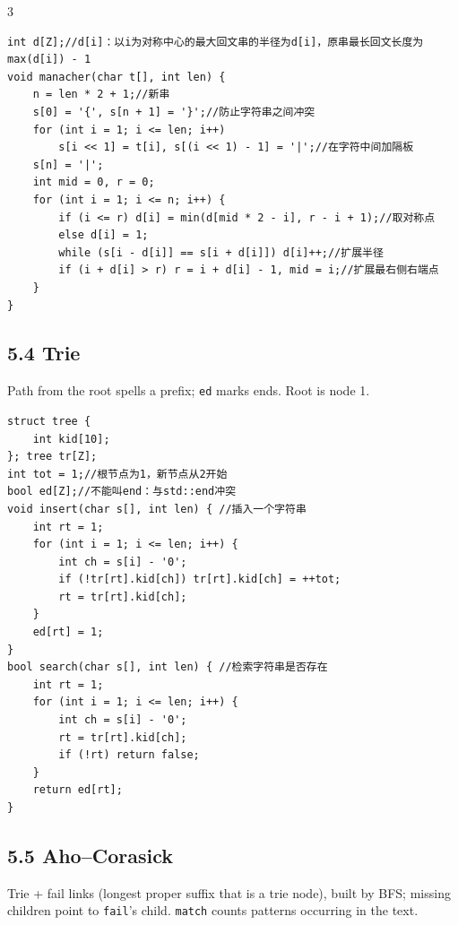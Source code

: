 \documentclass[8pt]{extarticle}
\begin{document}
\begin{multicols*}{3}
\begin{lstlisting}
int d[Z];//d[i]：以i为对称中心的最大回文串的半径为d[i]，原串最长回文长度为max(d[i]) - 1
void manacher(char t[], int len) {
    n = len * 2 + 1;//新串
    s[0] = '{', s[n + 1] = '}';//防止字符串之间冲突
    for (int i = 1; i <= len; i++)
        s[i << 1] = t[i], s[(i << 1) - 1] = '|';//在字符中间加隔板
    s[n] = '|';
    int mid = 0, r = 0;
    for (int i = 1; i <= n; i++) {
        if (i <= r) d[i] = min(d[mid * 2 - i], r - i + 1);//取对称点
        else d[i] = 1;
        while (s[i - d[i]] == s[i + d[i]]) d[i]++;//扩展半径
        if (i + d[i] > r) r = i + d[i] - 1, mid = i;//扩展最右侧右端点
    }
}
\end{lstlisting}

\subsection*{5.4 Trie}

Path from the root spells a prefix; \texttt{ed} marks ends. Root is node 1.


\begin{lstlisting}
struct tree {
    int kid[10];
}; tree tr[Z];
int tot = 1;//根节点为1，新节点从2开始
bool ed[Z];//不能叫end：与std::end冲突
void insert(char s[], int len) { //插入一个字符串
    int rt = 1;
    for (int i = 1; i <= len; i++) {
        int ch = s[i] - '0';
        if (!tr[rt].kid[ch]) tr[rt].kid[ch] = ++tot;
        rt = tr[rt].kid[ch];
    }
    ed[rt] = 1;
}
bool search(char s[], int len) { //检索字符串是否存在
    int rt = 1;
    for (int i = 1; i <= len; i++) {
        int ch = s[i] - '0';
        rt = tr[rt].kid[ch];
        if (!rt) return false;
    }
    return ed[rt];
}
\end{lstlisting}

\subsection*{5.5 Aho--Corasick}

Trie + fail links (longest proper suffix that is a trie node), built by BFS; missing children point to \texttt{fail}'s child. \texttt{match} counts patterns occurring in the text.



\end{multicols*}
\end{document}
